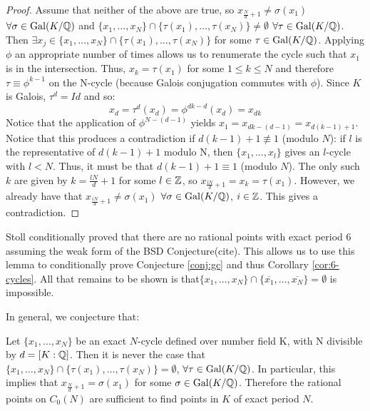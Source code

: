 \begin{proof}
	Assume that neither of the above are true, so $x_{\frac{N}{d}+1}
	\neq \sigma(x_1)$ $\forall \sigma \in \mathrm{Gal}(K/\mathbb{Q})$ and $\{x_1, \ldots
	, x_{N}\} \cap \{\tau(x_1), \ldots, \tau(x_{N})\} \neq \emptyset$ $
	\forall \tau \in \mathrm{Gal}(K/\mathbb{Q})$. Then $\exists x_j \in \{x_1, \ldots,
	x_{N}\} \cap \{\tau(x_1), \ldots, \tau(x_{N})\}$ for some $\tau
	\in \mathrm{Gal}(K/\mathbb{Q})$. Applying $\phi$ an appropriate number of times
	allows us to renumerate the cycle	such that $x_1$ is in the
	intersection. Thus, $x_k = \tau(x_1)$ for some $1 \leq k \leq N$
	and therefore $\tau \equiv \phi^{k-1}$ on the N-cycle (because Galois
	conjugation commutes with $\phi$). Since $K$ is Galois,
	$\tau^d = Id$ and so:
	\[
		x_d = \tau^d(x_d) = \phi^{dk-d}(x_d) = x_{dk}
	\]
	Notice that the application of $\phi^{N-(d-1)}$ yields $x_1 =
	x_{dk-(d-1)} = x_{d(k-1) + 1}$. Notice that this produces a
	contradiction if $d(k-1) + 1 \not\equiv 1$ (modulo $N$): if $l$
	is the representative of $d(k-1) + 1$ modulo N, then $\{x_1, \ldots
	, x_l\}$ gives an $l$-cycle with $l < N$. Thus, it must be that
	$d(k-1) + 1 \equiv 1$ (modulo $N$). The only such $k$ are given
	by $k = \frac{lN}{d} + 1$ for some $l \in \mathbb{Z}$, so $x_{\frac{lN}{d}
	+ 1} = x_k = \tau(x_1)$.	However, we already have that
	$x_{\frac{iN}{d}+1} \neq \sigma(x_1)$ $\forall \sigma \in \mathrm{Gal}(K/\mathbb{Q})$,
	$i \in \mathbb{Z}$. This gives a contradiction.
\end{proof}

\begin{remark}[N = 6 case]
	Stoll conditionally proved that there are no rational points with
	exact period 6 assuming the weak form of the BSD Conjecture(cite).
	This allows us to use this lemma to conditionally prove Conjecture
	\ref{conj:gc} and thus Corollary \ref{cor:6-cycles}. All that
	remains to be shown is that$\{x_1, \ldots, x_{N}\} \cap \{\overline{
	x_1}, \ldots, \overline{x_{N}}\} = \emptyset$ is impossible.
\end{remark}

In general, we conjecture that:
\begin{conjecture}
	Let $\{x_1, \ldots, x_{N}\}$ be an exact $N$-cycle defined over
	number field K, with N divisible by	$d = [K:\mathbb{Q} ]$. Then it is
	never the case that $\{x_1, \ldots, x_{N}\} \cap \{\tau(x_1), \ldots
	, \tau(x_{N})\} = \emptyset$, $\forall \tau \in \mathrm{Gal}(K/\mathbb{Q})$. In
	particular, this implies that $x_{\frac{N}{d}+1} =\sigma(x_1)$ for
	some $\sigma \in \mathrm{Gal}(K/\mathbb{Q})$. Therefore the rational points on
	$C_0(N)$ are sufficient to find points in $K$ of exact period $N$.
\end{conjecture}

